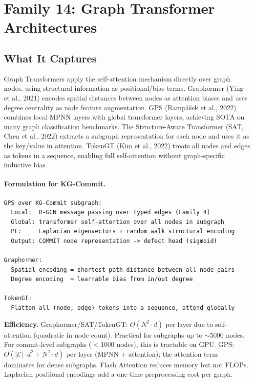 \documentclass[12pt,a4paper]{article}
\begin{document}
\section{Family 14: Graph Transformer Architectures}

\subsection{What It Captures}

Graph Transformers apply the self-attention mechanism directly over graph nodes,
using structural information as positional/bias terms. Graphormer (Ying et al.,
2021) encodes spatial distances between nodes as attention biases and uses degree
centrality as node feature augmentation. GPS (Ramp\'{a}\v{s}ek et al., 2022)
combines local MPNN layers with global transformer layers, achieving SOTA on
many graph classification benchmarks. The Structure-Aware Transformer (SAT, Chen
et al., 2022) extracts a subgraph representation for each node and uses it as
the key/value in attention. TokenGT (Kim et al., 2022) treats all nodes and
edges as tokens in a sequence, enabling full self-attention without graph-specific
inductive bias.

\paragraph{Formulation for KG-Commit.}
\begin{lstlisting}
GPS over KG-Commit subgraph:
  Local:  R-GCN message passing over typed edges (Family 4)
  Global: transformer self-attention over all nodes in subgraph
  PE:     Laplacian eigenvectors + random walk structural encoding
  Output: COMMIT node representation -> defect head (sigmoid)

Graphormer:
  Spatial encoding = shortest path distance between all node pairs
  Degree encoding  = learnable bias from in/out degree

TokenGT:
  Flatten all (node, edge) tokens into a sequence, attend globally
\end{lstlisting}

\begin{effbox}
\textbf{Efficiency.}
Graphormer/SAT/TokenGT: $O(N^2 \cdot d)$ per layer due to self-attention
(quadratic in node count). Practical for subgraphs up to $\sim$5000 nodes.
For commit-level subgraphs ($<$1000 nodes), this is tractable on GPU.
GPS: $O(|\mathcal{E}| \cdot d^2 + N^2 \cdot d)$ per layer (MPNN + attention);
the attention term dominates for dense subgraphs. Flash Attention reduces memory
but not FLOPs. Laplacian positional encodings add a one-time preprocessing cost
per graph.
\end{effbox}
\end{document}
